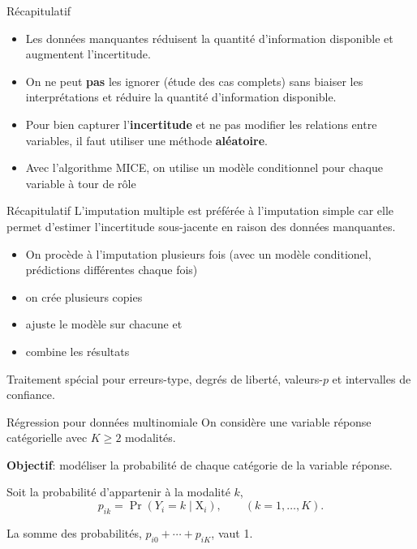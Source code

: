 \documentclass[
  ignorenonframetext,
]{beamer}
\providecommand{\tightlist}{%
  \setlength{\itemsep}{0pt}\setlength{\parskip}{0pt}}\usepackage{longtable,booktabs,array}
\begin{document}
\begin{frame}{Récapitulatif}
\protect\hypertarget{ruxe9capitulatif}{}
\begin{itemize}
\tightlist
\item
  Les données manquantes réduisent la quantité d'information disponible
  et augmentent l'incertitude.
\item
  On ne peut \textbf{pas} les ignorer (étude des cas complets) sans
  biaiser les interprétations et réduire la quantité d'information
  disponible.
\item
  Pour bien capturer l'\textbf{incertitude} et ne pas modifier les
  relations entre variables, il faut utiliser une méthode
  \textbf{aléatoire}.
\item
  Avec l'algorithme MICE, on utilise un modèle conditionnel pour chaque
  variable à tour de rôle
\end{itemize}
\end{frame}

\begin{frame}{Récapitulatif}
\protect\hypertarget{ruxe9capitulatif-1}{}
L'imputation multiple est préférée à l'imputation simple car elle permet
d'estimer l'incertitude sous-jacente en raison des données manquantes.

\begin{itemize}
\tightlist
\item
  On procède à l'imputation plusieurs fois (avec un modèle conditionel,
  prédictions différentes chaque fois)
\item
  on crée plusieurs copies
\item
  ajuste le modèle sur chacune et
\item
  combine les résultats
\end{itemize}

Traitement spécial pour erreurs-type, degrés de liberté, valeurs-\(p\)
et intervalles de confiance.
\end{frame}

\begin{frame}{Régression pour données multinomiale}
\protect\hypertarget{ruxe9gression-pour-donnuxe9es-multinomiale}{}
On considère une variable réponse catégorielle avec \(K \ge 2\)
modalités.

\textbf{Objectif}: modéliser la probabilité de chaque catégorie de la
variable réponse.

Soit la probabilité d'appartenir à la modalité \(k\),
\[p_{ik} = \Pr(Y_i=k \mid \mathrm{X}_i), \qquad (k=1, \ldots, K).\]

La somme des probabilités, \(p_{i0} + \cdots + p_{iK}\), vaut 1.
\end{frame}
\end{document}
